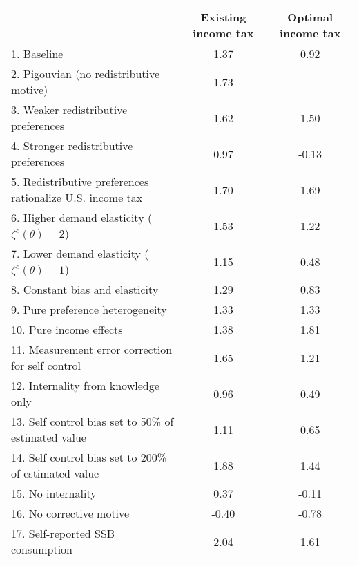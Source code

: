\begin{tabular}{lcc}
\hline
\hline
 & Existing income tax & Optimal income tax \\
\hline
1. Baseline & 1.37 & 0.92 \\
2. Pigouvian (no redistributive motive) & 1.73 & - \\
3. Weaker redistributive preferences & 1.62 & 1.50 \\
4. Stronger redistributive preferences & 0.97 & -0.13 \\
5. Redistributive preferences rationalize U.S. income tax & 1.70 & 1.69 \\
6. Higher demand elasticity ($\zeta^c(\theta) = 2$) & 1.53 & 1.22 \\
7. Lower demand elasticity ($\zeta^c(\theta) = 1$) & 1.15 & 0.48 \\
8. Constant bias and elasticity & 1.29 & 0.83 \\
9. Pure preference heterogeneity & 1.33 & 1.33 \\
10. Pure income effects & 1.38 & 1.81 \\
11. Measurement error correction for self control & 1.65 & 1.21 \\
12. Internality from knowledge only & 0.96 & 0.49 \\
13. Self control bias set to 50\% of estimated value & 1.11 & 0.65 \\
14. Self control bias set to 200\% of estimated value & 1.88 & 1.44 \\
15. No internality & 0.37 & -0.11 \\
16. No corrective motive & -0.40 & -0.78 \\
17. Self-reported SSB consumption & 2.04 & 1.61 \\
\hline
\hline
\end{tabular}
